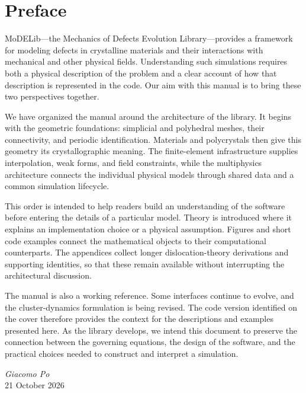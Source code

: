 \chapter*{Preface}
MoDELib---the Mechanics of Defects Evolution Library---provides a framework for modeling defects in crystalline materials and their interactions with mechanical and other physical fields. Understanding such simulations requires both a physical description of the problem and a clear account of how that description is represented in the code. Our aim with this manual is to bring these two perspectives together.

We have organized the manual around the architecture of the library. It begins with the geometric foundations: simplicial and polyhedral meshes, their connectivity, and periodic identification. Materials and polycrystals then give this geometry its crystallographic meaning. The finite-element infrastructure supplies interpolation, weak forms, and field constraints, while the multiphysics architecture connects the individual physical models through shared data and a common simulation lifecycle.

This order is intended to help readers build an understanding of the software before entering the details of a particular model. Theory is introduced where it explains an implementation choice or a physical assumption. Figures and short code examples connect the mathematical objects to their computational counterparts. The appendices collect longer dislocation-theory derivations and supporting identities, so that these remain available without interrupting the architectural discussion.

The manual is also a working reference. Some interfaces continue to evolve, and the cluster-dynamics formulation is being revised. The code version identified on the cover therefore provides the context for the descriptions and examples presented here. As the library develops, we intend this document to preserve the connection between the governing equations, the design of the software, and the practical choices needed to construct and interpret a simulation.

\vspace{1.2cm}
\begin{flushright}
\textit{Giacomo Po}\\[0.3em]
21 October 2026
\end{flushright}
